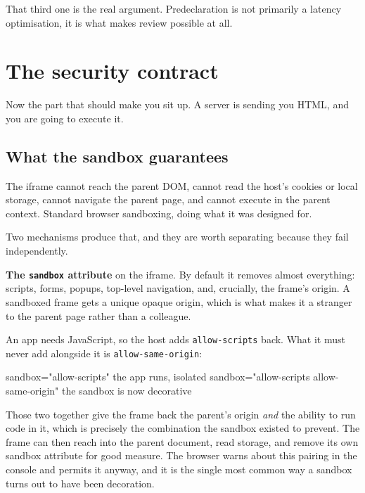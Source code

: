 That third one is the real argument. Predeclaration is not primarily a latency
optimisation, it is what makes review possible at all.

\section{The security contract}

Now the part that should make you sit up. A server is sending you HTML, and you
are going to execute it.


\subsection{What the sandbox guarantees}

The iframe cannot reach the parent DOM, cannot read the host's cookies or local
storage, cannot navigate the parent page, and cannot execute in the parent
context. Standard browser sandboxing, doing what it was designed for.

Two mechanisms produce that, and they are worth separating because they fail
independently.

\textbf{The \texttt{sandbox} attribute} on the iframe. By default it removes
almost everything: scripts, forms, popups, top-level navigation, and, crucially,
the frame's origin. A sandboxed frame gets a unique opaque origin, which is what
makes it a stranger to the parent page rather than a colleague.

An app needs JavaScript, so the host adds \texttt{allow-scripts} back. What it
must never add alongside it is \texttt{allow-same-origin}:

\begin{plain}
sandbox="allow-scripts"                      the app runs, isolated
sandbox="allow-scripts allow-same-origin"    the sandbox is now decorative
\end{plain}

Those two together give the frame back the parent's origin \emph{and} the
ability to run code in it, which is precisely the combination the sandbox
existed to prevent. The frame can then reach into the parent document, read
storage, and remove its own sandbox attribute for good measure. The browser
warns about this pairing in the console and permits it anyway, and it is the
single most common way a sandbox turns out to have been decoration.

